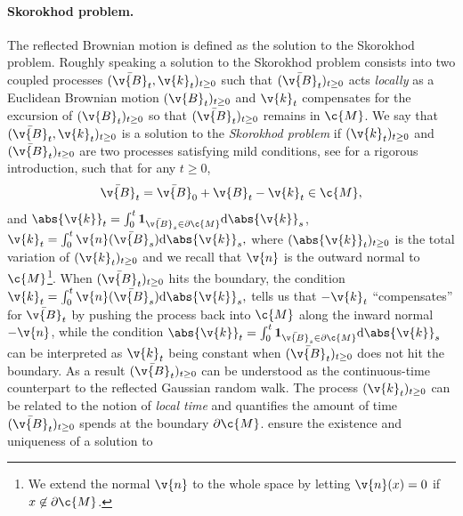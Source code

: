 \paragraph{Skorokhod problem.}
The reflected Brownian motion is defined as the solution to the Skorokhod problem.
Roughly speaking a solution to the Skorokhod problem consists into two coupled processes $(\bar{ \v{B}}_t, \v{k}_t)_{t \geq 0}$ such that $(\bar{ \v{B}}_t)_{t \geq 0}$ acts \emph{locally} as a Euclidean Brownian motion $( \v{B}_t)_{t \geq 0}$ and $ \v{k}_t$ compensates for the excursion of $( \v{B}_t)_{t \geq 0}$ so that $(\bar{ \v{B}}_t)_{t \geq 0}$ remains in $\c{M}$.
We say that $(\bar{ \v{B}}_t, \v{k}_t)_{t \geq 0}$ is a solution to the \emph{Skorokhod problem} \parencite{skorokhod1961stochastic} if $( \v{k}_t)_{t \geq 0}$ and $(\bar{ \v{B}}_t)_{t \geq 0}$ are two processes satisfying mild conditions, see  for a rigorous introduction, such that for any $t \geq 0$, \begin{equation} \label{eq:rbm} \bar{ \v{B}}_t = \bar{ \v{B}}_0 + \v{B}_t - \v{k}_t \in \c{M}, \end{equation} and $\textstyle{\abs{ \v{k}}_t = \int_0^t \mathbf{1}_{\bar{ \v{B}}_s \in \partial \c{M}} \mathrm{d} \abs{ \v{k}}_s}$, $\textstyle{ \v{k}_t = \int_0^t \v{n}(\bar{ \v{B}}_s) \mathrm{d} \abs{ \v{k}}_s ,}$ where $(\abs{ \v{k}}_t)_{t \geq 0}$ is the total variation of $( \v{k}_t)_{t \geq 0}$ and we recall that $ \v{n}$ is the outward normal to $\c{M}$\footnote{We extend the normal $ \v{n}$ to the whole space by letting $ \v{n}(x)=0$ if $x \not \in \partial \c{M}$.
}.
When $(\bar{ \v{B}}_t)_{t \geq 0}$ hits the boundary, the condition $\textstyle{ \v{k}_t = \int_0^t \v{n}(\bar{ \v{B}}_s) \mathrm{d} \abs{ \v{k}}_s ,}$ tells us that $- \v{k}_t$ ``compensates'' for $\bar{ \v{B}}_t$ by pushing the process back into $\c{M}$ along the inward normal $- \v{n}$, while the condition $\textstyle{\abs{ \v{k}}_t = \int_0^t \mathbf{1}_{\bar{ \v{B}}_s \in \partial \c{M}} \mathrm{d} \abs{ \v{k}}_s}$ can be interpreted as $ \v{k}_t$ being constant when $(\bar{ \v{B}}_t)_{t \geq 0}$ does not hit the boundary.
As a result $(\bar{ \v{B}}_t)_{t \geq 0}$ can be understood as the continuous-time counterpart to the reflected Gaussian random walk.
The process $( \v{k}_t)_{t \geq 0}$ can be related to the notion of \emph{local time} \parencite{revuz2013continuous} and quantifies the amount of time $(\bar{ \v{B}}_t)_{t \geq 0}$ spends at the boundary $\partial \c{M}$.
\textcite[Theorem
	2.1]{lions1984stochastic} ensure the existence and uniqueness of a solution to
